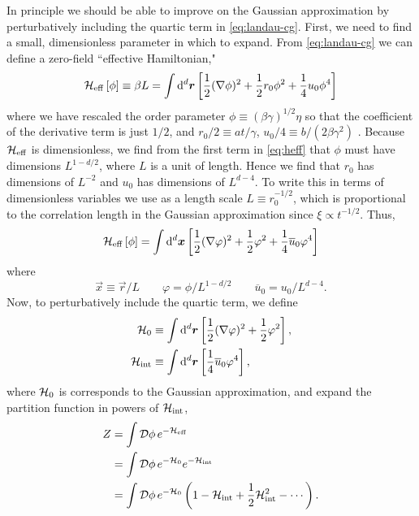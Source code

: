 In principle we should be able to improve on the Gaussian approximation by
perturbatively including the quartic term in \cref{eq:landau-cg}. First, we
need to find a small, dimensionless parameter in which to expand. From
\cref{eq:landau-cg} we can define a zero-field ``effective Hamiltonian,"
\begin{equation}
  \mathcal{H}_{\mathrm{eff}}\left[\phi\right] \equiv \beta L
  = \int \mathop{}\!\mathrm{d}^d \bm{r} \left[
    \frac{1}{2}(\nabla\phi)^2 +
    \frac{1}{2} r_0 \phi^2 +
    \frac{1}{4} u_0 \phi^4\right]
  \label{eq:heff}
\end{equation}
where we have rescaled the order parameter
$\phi \equiv (\beta\gamma)^{1/2}\eta$
so that the coefficient of the derivative term is just $1/2$, and
$r_0/2 \equiv a t/\gamma$,
$u_0/4 \equiv b/(2 \beta \gamma^2)$
\autocite{goldenfeld1992lectures}.
Because $\mathcal{H}_{\mathrm{eff}}$ is dimensionless, we find from the first term in
\cref{eq:heff} that $\phi$ must have dimensions $L^{1-d/2}$, where $L$ is a
unit of length. Hence we find that $r_0$ has dimensions of $L^{-2}$ and $u_0$
has dimensions of $L^{d-4}$. To write this in terms of dimensionless variables
we use as a length scale $L \equiv r_0^{-1/2}$, which is proportional to the
correlation length in the Gaussian approximation since $\xi \propto t^{-1/2}$.
Thus,
\begin{equation}
  \mathcal{H}_{\mathrm{eff}}\left[\phi\right]
  = \int \mathop{}\!\mathrm{d}^d \bm{x}
    \left[
      \frac{1}{2}
      (\nabla\varphi)^2 +
      \frac{1}{2} \varphi^2 +
      \frac{1}{4} \overline{u}_0 \varphi^4\right]
\end{equation}
where
\begin{equation}
  \vec{x}\equiv\vec{r}/L\qquad
  \varphi = \phi/L^{1-d/2}\qquad
  \overline{u}_0 = u_0/L^{d-4}.
\end{equation}
Now, to perturbatively include the quartic term, we define
\begin{align}
  \mathcal{H}_0  &\equiv \int\mathop{}\!\mathrm{d}^d\bm{r}\left[\frac{1}{2}(\nabla\varphi)^2 + \frac{1}{2} \varphi^2\right], \\
  \mathcal{H}_{\mathrm{int}} &\equiv \int\mathop{}\!\mathrm{d}^d\bm{r}\left[\frac{1}{4} \overline{u}_0 \varphi^4\right],
  \label{eq:ham-int}
\end{align}
where $\mathcal{H}_0$ is corresponds to the Gaussian approximation, and expand the
partition function in powers of $\mathcal{H}_{\mathrm{int}}$,
\begin{align*}
  Z
  &= \int\mathcal{D}\phi \, e^{-\mathcal{H}_{\mathrm{eff}}} \\
  &= \int\mathcal{D}\phi \, e^{-\mathcal{H}_0} e^{-\mathcal{H}_{\mathrm{int}}} \\
  &= \int\mathcal{D}\phi \, e^{-\mathcal{H}_0} \left(1 - \mathcal{H}_{\mathrm{int}} + \frac{1}{2} \mathcal{H}_{\mathrm{int}}^2 - \cdots\right).
\end{align*}

